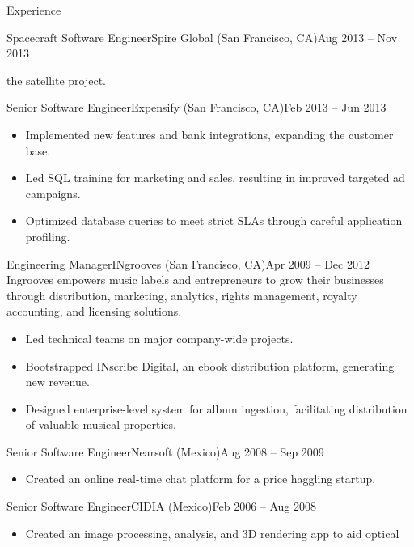 \documentclass[colibri]{mcdowellcv}
\begin{document}
\begin{cvsection}{Experience}
\begin{cvsubsection}{Spacecraft Software Engineer}{Spire Global (San Francisco, CA)}{Aug 2013 -- Nov 2013}
\begin{itemize}
      the satellite project.
		\end{itemize}
	\end{cvsubsection}
	\begin{cvsubsection}{Senior Software Engineer}{Expensify (San Francisco, CA)}{Feb 2013 -- Jun 2013}
		\begin{itemize}
    \item
      Implemented new features and bank integrations, expanding the customer base.
    \item
      Led SQL training for marketing and sales, resulting in improved targeted
      ad campaigns.
    \item
      Optimized database queries to meet strict SLAs through careful application
      profiling.
		\end{itemize}
	\end{cvsubsection}
	\begin{cvsubsection}{Engineering Manager}{INgrooves (San Francisco, CA)}{Apr 2009 -- Dec 2012}
    Ingrooves empowers music labels and entrepreneurs to grow their businesses
    through distribution, marketing, analytics, rights management, royalty
    accounting, and licensing solutions.
    \newline
		\begin{itemize}
    \item
      Led technical teams on major company-wide projects.
    \item
      Bootstrapped INscribe Digital, an ebook distribution platform, generating
      new revenue.
    \item
      Designed enterprise-level system for album ingestion, facilitating
      distribution of valuable musical properties.
    \end{itemize}
	\end{cvsubsection}
	\begin{cvsubsection}{Senior Software Engineer}{Nearsoft (Mexico)}{Aug 2008 -- Sep 2009}
		\begin{itemize}
    \item
      Created an online real-time chat platform for a price haggling startup.
		\end{itemize}
	\end{cvsubsection}
	\begin{cvsubsection}{Senior Software Engineer}{CIDIA (Mexico)}{Feb 2006 -- Aug 2008}
		\begin{itemize}
    \item
      Created an image processing, analysis, and 3D rendering app to aid optical

\end{itemize}
\end{cvsubsection}
\end{cvsection}
\end{document}
